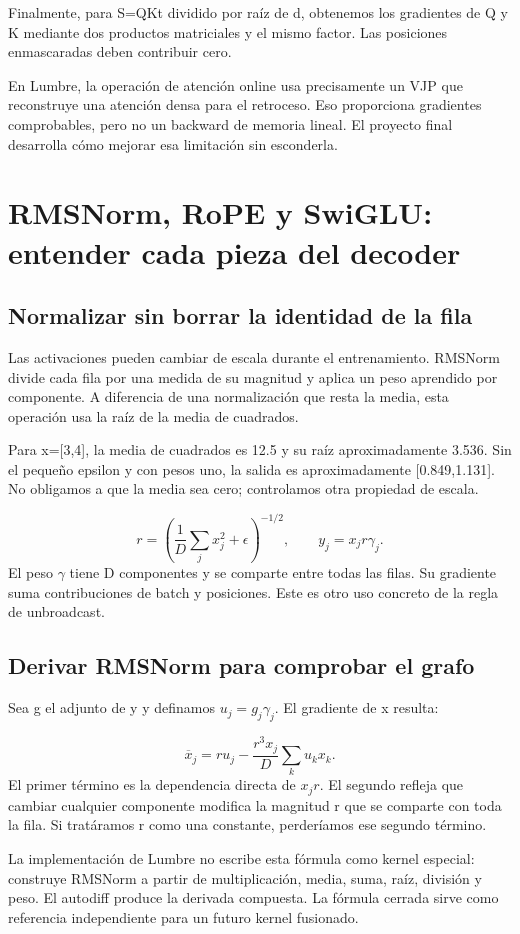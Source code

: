 \documentclass[12pt,a4paper,oneside]{report}
\begin{document}
Finalmente, para S=QKt dividido por raíz de d, obtenemos los gradientes de Q y K mediante dos productos matriciales y el mismo factor. Las posiciones enmascaradas deben contribuir cero.

En Lumbre, la operación de atención online usa precisamente un VJP que reconstruye una atención densa para el retroceso. Eso proporciona gradientes comprobables, pero no un backward de memoria lineal. El proyecto final desarrolla cómo mejorar esa limitación sin esconderla.

\chapter{RMSNorm, RoPE y SwiGLU: entender cada pieza del decoder}
\label{ch:decoder-piezas}
\section{Normalizar sin borrar la identidad de la fila}
Las activaciones pueden cambiar de escala durante el entrenamiento. RMSNorm divide cada fila por una medida de su magnitud y aplica un peso aprendido por componente. A diferencia de una normalización que resta la media, esta operación usa la raíz de la media de cuadrados. \cite{rmsnorm}

Para x=[3,4], la media de cuadrados es 12.5 y su raíz aproximadamente 3.536. Sin el pequeño epsilon y con pesos uno, la salida es aproximadamente [0.849,1.131]. No obligamos a que la media sea cero; controlamos otra propiedad de escala.

\[
r=\left(\frac1D\sum_j x_j^2+\epsilon\right)^{-1/2},\qquad
 y_j=x_jr\gamma_j.
\]
El peso $\gamma$ tiene D componentes y se comparte entre todas las filas. Su gradiente suma contribuciones de batch y posiciones. Este es otro uso concreto de la regla de unbroadcast.

\section{Derivar RMSNorm para comprobar el grafo}
Sea g el adjunto de y y definamos $u_j=g_j\gamma_j$. El gradiente de x resulta:

\[
\overline x_j=r u_j-\frac{r^3x_j}{D}\sum_k u_kx_k.
\]
El primer término es la dependencia directa de $x_jr$. El segundo refleja que cambiar cualquier componente modifica la magnitud r que se comparte con toda la fila. Si tratáramos r como una constante, perderíamos ese segundo término.

La implementación de Lumbre no escribe esta fórmula como kernel especial: construye RMSNorm a partir de multiplicación, media, suma, raíz, división y peso. El autodiff produce la derivada compuesta. La fórmula cerrada sirve como referencia independiente para un futuro kernel fusionado.
\end{document}
